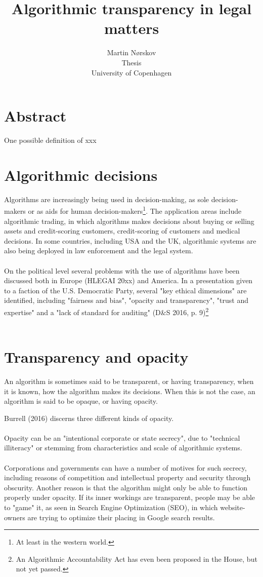 \documentclass{article}
\title{Algorithmic transparency in legal matters}
\author{Martin Nørskov \\ Thesis \\ University of Copenhagen }
\begin{document}
\maketitle

\newtheorem{definition}{Definition}

\section*{Abstract}

One possible definition of xxx




\section*{Algorithmic decisions}

Algorithms are increasingly being used in decision-making, as sole decision-makers or as aids for human decision-makers\footnote{At least in the western world.}. The application areas include algorithmic trading, in which algorithms makes decisions about buying or selling assets and credit-scoring customers, credit-scoring of customers and medical decisions. In some countries, including USA and the UK, algorithmic systems are also being deployed in law enforcement and the legal system. 
\\
\\
On the political level several problems with the use of algorithms have been discussed both in Europe (HLEGAI 20xx) and America. In a presentation given to a faction of the U.S. Democratic Party, several "key ethical dimensions" are identified, including "fairness and bias", "opacity and transparency", "trust and expertise" and a "lack of standard for auditing" (D\&S 2016, p. 9)\footnote {An Algorithmic Accountability Act has even been proposed in the House, but not yet passed.}
\\
\\
\section*{Transparency and opacity}
An algorithm is sometimes said to be transparent, or having transparency, when it is known, how the algorithm makes its decisions. When this is not the case, an algorithm is said to be opaque, or having opacity.

Burrell (2016) discerns three different kinds of opacity.
\\
\\
Opacity can be an "intentional corporate or state secrecy", due to "technical illiteracy" or stemming from characteristics and scale of algorithmic systems.
\\
\\
Corporations and governments can have a number of motives for such secrecy, including reasons of competition and intellectual property and security through obscurity. Another reason is that the algorithm might only be able to function properly under opacity. If its inner workings are transparent, people may be able to "game" it, as seen in Search Engine Optimization (SEO), in which website-owners are trying to optimize their placing in Google search results.
\end{document}
